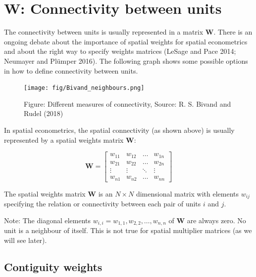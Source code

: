 \documentclass[
  letterpaper,
]{scrbook}
\begin{document}
\hypertarget{boldsymbolmathbfw-connectivity-between-units}{%
\section{\texorpdfstring{\(\boldsymbol{\mathbf{W}}\): Connectivity
between
units}{\textbackslash boldsymbol\{\textbackslash mathbf\{W\}\}: Connectivity between units}}\label{boldsymbolmathbfw-connectivity-between-units}}

The connectivity between units is usually represented in a matrix
\(\boldsymbol{\mathbf{W}}\). There is an ongoing debate about the
importance of spatial weights for spatial econometrics and about the
right way to specify weights matrices (LeSage and Pace 2014; Neumayer
and Plümper 2016). The following graph shows some possible options in
how to define connectivity between units.

\begin{figure}

{\centering \texttt{[image: fig/Bivand\_neighbours.png]}

}

\caption{Figure: Different measures of connectivity, Source: R. S.
Bivand and Rudel (2018)}

\end{figure}

In spatial econometrics, the spatial connectivity (as shown above) is
usually represented by a spatial weights matrix
\({\boldsymbol{\mathbf{W}}}\):

\[
\boldsymbol{\mathbf{W}} = \begin{bmatrix} 
    w_{11} & w_{12} & \dots & w_{1n} \\
    w_{21} & w_{22} & \dots & w_{2n} \\
    \vdots & \vdots & \ddots & \vdots \\
    w_{n1} & w_{n2} & \dots     & w_{nn} 
    \end{bmatrix}
\]

The spatial weights matrix \(\boldsymbol{\mathbf{W}}\) is an
\(N \times N\) dimensional matrix with elements \(w_{ij}\) specifying
the relation or connectivity between each pair of units \(i\) and \(j\).

Note: The diagonal elements
\(w_{i,i}= w_{1,1}, w_{2,2}, \dots, w_{n,n}\) of
\(\boldsymbol{\mathbf{W}}\) are always zero. No unit is a neighbour of
itself. This is not true for spatial multiplier matrices (as we will see
later).

\hypertarget{contiguity-weights}{%
\subsection{Contiguity weights}\label{contiguity-weights}}
\end{document}
